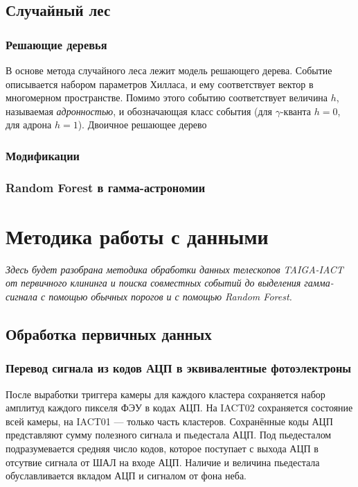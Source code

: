 \documentclass[magd,floatypics,numeref]{msudipl} %
\begin{document}
\section{Случайный лес}
\subsection{Решающие деревья}
В основе метода случайного леса лежит модель решающего дерева. Событие описывается набором параметров Хилласа, и ему соответствует вектор в многомерном пространстве. Помимо этого событию соответствует величина $h$, называемая \textit{адронностью}, и обозначающая класс события (для $\gamma$-кванта $h=0$, для адрона $h = 1$). Двоичное решающее дерево 
\subsection{Модификации}
\subsection{Random Forest в гамма-астрономии}

\chapter{Методика работы с данными}
\textit{Здесь будет разобрана методика обработки данных телескопов TAIGA-IACT от первичного клининга и поиска совместных событий до выделения гамма-сигнала с помощью обычных порогов и с помощью Random Forest.}
\section{Обработка первичных данных}
\label{primaryDataProcessing}
\subsection{Перевод сигнала из кодов АЦП в эквивалентные фотоэлектроны}
После выработки триггера камеры для каждого кластера сохраняется набор амплитуд каждого пикселя ФЭУ в кодах АЦП. На IACT02 сохраняется состояние всей камеры, на IACT01 --- только часть кластеров. Сохранённые коды АЦП представляют сумму полезного сигнала и пьедестала АЦП. Под пьедесталом подразумевается средняя число кодов, которое поступает с выхода АЦП в отсутвие сигнала от ШАЛ на входе АЦП. Наличие и величина пьедестала обуславливается вкладом АЦП и сигналом от фона неба.
\end{document}

